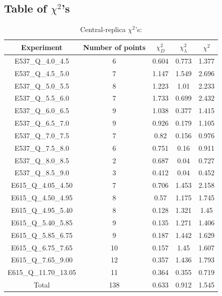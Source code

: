 \documentclass[]{article}
\begin{document}
\hypertarget{table-of-chi2s}{%
\subsection{\texorpdfstring{Table of
\(\chi^2\)'s}{Table of \textbackslash{}chi\^{}2's}}\label{table-of-chi2s}}

\begin{table}[h]

\centering

\begin{tabular}{|c|c|c|c|c|} \hline

\textbf{Experiment} & \textbf{Number of
points} & \textbf{\(\chi_{D}^2\)} & \textbf{\(\chi_{\lambda}^2\)} & \textbf{\(\chi^2\)} \\ \hline

E537\_Q\_4.0\_4.5 & 6 & 0.604 & 0.773 & 1.377 \\ \hline
E537\_Q\_4.5\_5.0 & 7 & 1.147 & 1.549 & 2.696 \\ \hline
E537\_Q\_5.0\_5.5 & 8 & 1.223 & 1.01 & 2.233 \\ \hline
E537\_Q\_5.5\_6.0 & 7 & 1.733 & 0.699 & 2.432 \\ \hline
E537\_Q\_6.0\_6.5 & 9 & 1.038 & 0.377 & 1.415 \\ \hline
E537\_Q\_6.5\_7.0 & 9 & 0.926 & 0.179 & 1.105 \\ \hline
E537\_Q\_7.0\_7.5 & 7 & 0.82 & 0.156 & 0.976 \\ \hline
E537\_Q\_7.5\_8.0 & 6 & 0.751 & 0.16 & 0.911 \\ \hline
E537\_Q\_8.0\_8.5 & 2 & 0.687 & 0.04 & 0.727 \\ \hline
E537\_Q\_8.5\_9.0 & 3 & 0.412 & 0.04 & 0.452 \\ \hline
E615\_Q\_4.05\_4.50 & 7 & 0.706 & 1.453 & 2.158 \\ \hline
E615\_Q\_4.50\_4.95 & 8 & 0.57 & 1.175 & 1.745 \\ \hline
E615\_Q\_4.95\_5.40 & 8 & 0.128 & 1.321 & 1.45 \\ \hline
E615\_Q\_5.40\_5.85 & 9 & 0.135 & 1.271 & 1.406 \\ \hline
E615\_Q\_5.85\_6.75 & 9 & 0.187 & 1.442 & 1.629 \\ \hline
E615\_Q\_6.75\_7.65 & 10 & 0.157 & 1.45 & 1.607 \\ \hline
E615\_Q\_7.65\_9.00 & 12 & 0.357 & 1.436 & 1.793 \\ \hline
E615\_Q\_11.70\_13.05 & 11 & 0.364 & 0.355 & 0.719 \\ \hline
Total & 138 & 0.633 & 0.912 & 1.545 \\ \hline

\end{tabular}

\caption{Central-replica \(\chi^2\)'s:}

\end{table}
\end{document}
